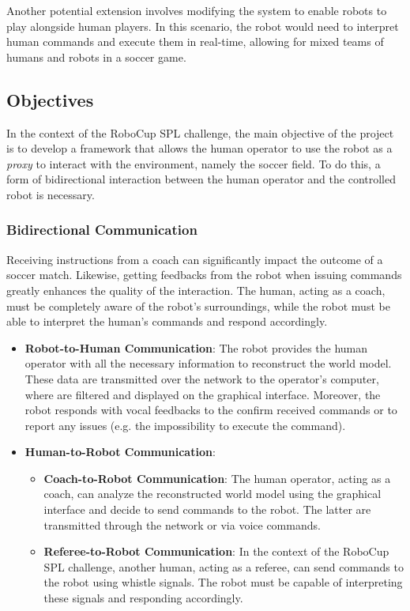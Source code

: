 \documentclass[a4paper, onecolumn, 12pt]{article}
\begin{document}
Another potential extension involves modifying the system to enable robots to play alongside human players. 
In this scenario, the robot would need to interpret human commands and execute them in real-time, allowing 
for mixed teams of humans and robots in a soccer game.

\subsection{Objectives}
\label{sec:obj}

In the context of the RoboCup SPL challenge, the main objective of the project is to develop a framework
that allows the human operator to use the robot as a \textit{proxy} to interact with the environment, namely the soccer
field. 
To do this, a form of bidirectional interaction between the human operator and the controlled robot is necessary. 

\subsubsection{Bidirectional Communication}  
Receiving instructions from a coach can significantly impact the outcome of a soccer match. 
Likewise, getting feedbacks from the robot when issuing commands greatly enhances 
the quality of the interaction. The human, acting as a coach, must be completely aware of the robot's surroundings,
while the robot must be able to interpret the human's commands and respond accordingly. 
\begin{itemize}  
    \item \textbf{Robot-to-Human Communication}: The robot provides the human operator with 
    all the necessary information to reconstruct the world model. These data are transmitted 
    over the network to the operator's computer, where are filtered and displayed on the 
    graphical interface. Moreover, the robot responds with vocal feedbacks to the confirm received 
    commands or to report any issues (e.g. the impossibility to execute the command).  
    \item \textbf{Human-to-Robot Communication}:  
    \begin{itemize}  
        \item \textbf{Coach-to-Robot Communication}: The human operator, acting as a coach, can 
        analyze the reconstructed world model using the graphical interface and decide to send commands to the robot. 
        The latter are transmitted through the network or via voice commands.  
        \item \textbf{Referee-to-Robot Communication}: In the context of the RoboCup 
        SPL challenge, another human, acting as a referee, can send commands to the robot using 
        whistle signals. The robot must be capable of interpreting these signals and responding 
        accordingly.
    \end{itemize}  
\end{itemize}
\end{document}
